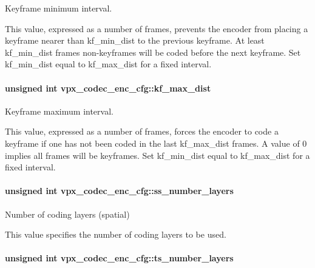 \-Keyframe minimum interval. 

\-This value, expressed as a number of frames, prevents the encoder from placing a keyframe nearer than kf\-\_\-min\-\_\-dist to the previous keyframe. \-At least kf\-\_\-min\-\_\-dist frames non-\/keyframes will be coded before the next keyframe. \-Set kf\-\_\-min\-\_\-dist equal to kf\-\_\-max\-\_\-dist for a fixed interval. \hypertarget{structvpx__codec__enc__cfg_ae018440136e271743376730413d25a9b}{
\paragraph[{kf\-\_\-max\-\_\-dist}]{\setlength{\rightskip}{0pt plus 5cm}unsigned int {\bf vpx\-\_\-codec\-\_\-enc\-\_\-cfg\-::kf\-\_\-max\-\_\-dist}}}\label{structvpx__codec__enc__cfg_ae018440136e271743376730413d25a9b}


\-Keyframe maximum interval. 

\-This value, expressed as a number of frames, forces the encoder to code a keyframe if one has not been coded in the last kf\-\_\-max\-\_\-dist frames. \-A value of 0 implies all frames will be keyframes. \-Set kf\-\_\-min\-\_\-dist equal to kf\-\_\-max\-\_\-dist for a fixed interval. \hypertarget{structvpx__codec__enc__cfg_a1e5e1d00b22f2ba8c5c7230f31900f95}{
\paragraph[{ss\-\_\-number\-\_\-layers}]{\setlength{\rightskip}{0pt plus 5cm}unsigned int {\bf vpx\-\_\-codec\-\_\-enc\-\_\-cfg\-::ss\-\_\-number\-\_\-layers}}}\label{structvpx__codec__enc__cfg_a1e5e1d00b22f2ba8c5c7230f31900f95}


\-Number of coding layers (spatial) 

\-This value specifies the number of coding layers to be used. \hypertarget{structvpx__codec__enc__cfg_a16d4549a30cbd585e3c3056ef873d8c7}{
\paragraph[{ts\-\_\-number\-\_\-layers}]{\setlength{\rightskip}{0pt plus 5cm}unsigned int {\bf vpx\-\_\-codec\-\_\-enc\-\_\-cfg\-::ts\-\_\-number\-\_\-layers}}}\label{structvpx__codec__enc__cfg_a16d4549a30cbd585e3c3056ef873d8c7}


